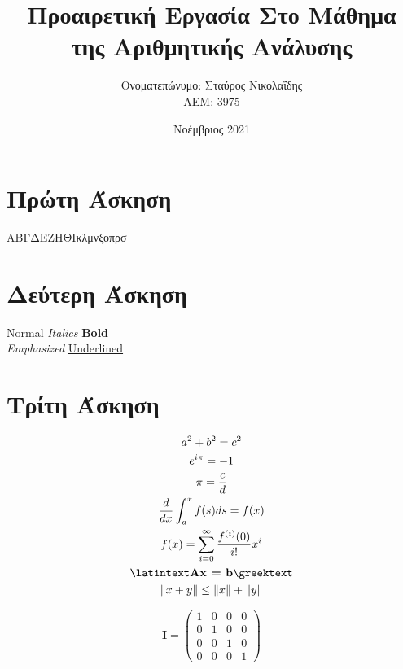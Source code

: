 \documentclass{article}
\title{Προαιρετική Εργασία
Στο Μάθημα της Αριθμητικής Ανάλυσης
}
\author{Ονοματεπώνυμο: Σταύρος Νικολαΐδης  \\  ΑΕΜ: 3975}
\date{Νοέμβριος 2021}
\newcommand{\lt}{\latintext}
\newcommand{\gt}{\greektext}
\begin{document}
\maketitle

\section{Πρώτη Άσκηση}

\begin{center}
{\tiny Α}{\scriptsize Β}{\footnotesize Γ}{\small Δ}{\normalsize Ε}{\large Ζ}{\Large Η}{\LARGE Θ}{\huge Ι}{\Huge κ}{\huge λ}{\LARGE μ}{\Large ν}{\large ξ}{\normalsize ο}{\small π}{\footnotesize ρ}{\scriptsize σ}
\end{center}

\section{Δεύτερη Άσκηση}

\begin{center}
\lt Normal \textit {Italics} \textbf {Bold} \\
\emph {Emphasized} \underline {Underlined} \gt
\end{center}

\section{Τρίτη Άσκηση}

\begin{gather*}
a^{2} + b^{2} = c^{2} \\
e^{i\pi} = -1 \\
\pi = \frac{c}{d} \\
\frac{d}{dx}\int_{a}^{x} f(s)ds = f(x) \\
f(x) = \sum_{i=0}^{\infty} \frac{f^{(i)}(0)}{i!}x^{i} \\
\lt\textbf{Ax = b}\gt \\
\| x + y \| \leq \| x \| + \| y \| \\
\end{gather*}

\begin{equation}
    \textbf{I} = \begin{pmatrix}
            1 & 0 & 0 & 0\\
            0 & 1 & 0 & 0\\
            0 & 0 & 1 & 0\\
            0 & 0 & 0 & 1
        \end{pmatrix}
\end{equation}
\end{document}
